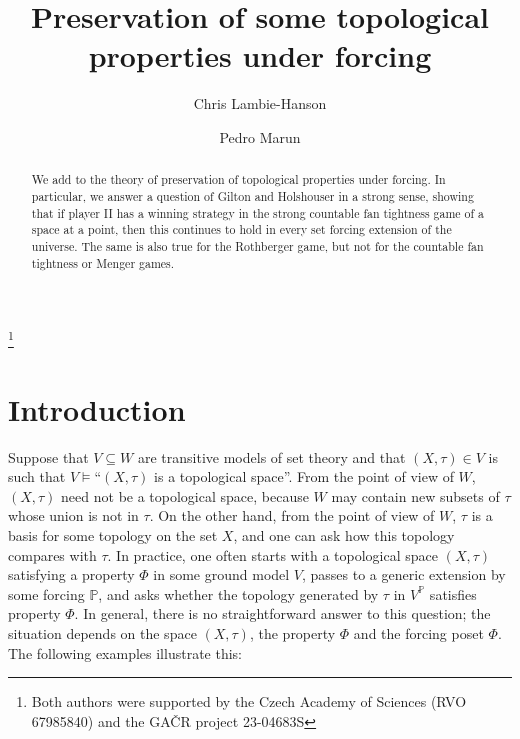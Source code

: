 \documentclass{amsart}
\title{Preservation of some topological properties under forcing}
\theoremstyle{definition}
\newcommand{\bb}{\mathbb}
\renewcommand{\P}{\bb{P}}
\renewcommand{\subset}{\subseteq}
\begin{document}
\author{Chris Lambie-Hanson}
\address{Institute of Mathematics, 
Czech Academy of Sciences, 
{\v Z}itn{\'a} 25, Prague 1, 
115 67, Czech Republic
}


\author{Pedro Marun}
\address{Institute of Mathematics, 
Czech Academy of Sciences, 
{\v Z}itn{\'a} 25, Prague 1, 
115 67, Czech Republic}

%


\thanks {Both authors were supported by the Czech Academy of Sciences (RVO 67985840) and the GA\v{C}R project 23-04683S}



\begin{abstract}
We add to the theory of preservation of topological properties under forcing. In particular, we answer a question of Gilton and Holshouser in a strong sense, showing that if player II has a winning strategy in the strong countable fan tightness game of a space at a point, then this continues to hold in every set forcing extension of the universe. The same is also true for the Rothberger game, but not for the countable fan tightness or Menger games.
\end{abstract}

\maketitle



\section{Introduction}

Suppose that $V\subset W$ are transitive models of set theory and that $(X,\tau)\in V$ is such that $V\models $``$(X,\tau)$ is a topological space''. From the point of view of $W$, $(X,\tau)$ need not be a topological space, because $W$ may contain new subsets of $\tau$ whose union is not in $\tau$. On the other hand, from the point of view of $W$, $\tau$ is a basis for some topology on the set $X$, and one can ask how this topology compares with $\tau$. In practice, one often starts with a topological space $(X,\tau)$ satisfying a property $\Phi$ in some ground model $V$, passes to a generic extension by some forcing $\P$, and asks whether the topology generated by $\tau$ in $V^\P$ satisfies property $\Phi$. In general, there is no straightforward answer to this question; the situation depends on the space $(X,\tau)$, the property $\Phi$ and the forcing poset $\Phi$. The following examples illustrate this:
\end{document}
